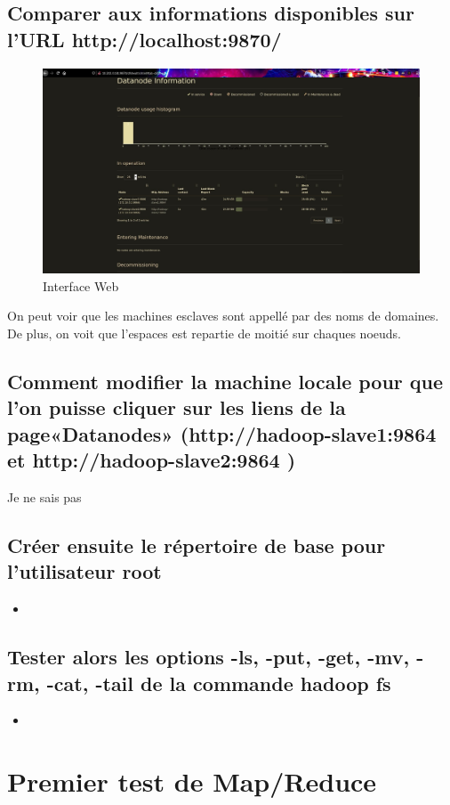 \documentclass[10pt,a4paper]{article}
\newcommand{\insertcode}[2]{\begin{itemize}\item[]\end{itemize}}
\begin{document}
\subsection{Comparer aux informations disponibles sur l’URL http://localhost:9870/}
\begin{figure}[h!]
\centering
\includegraphics[scale=0.20]{image/1.jpg}
\caption{Interface Web }
\label{fig:net }
\end{figure}
On peut voir que les machines esclaves sont appellé par des noms de domaines. De plus, on voit que l'espaces est repartie de moitié sur chaques noeuds.

\subsection{Comment   modifier   la   machine   locale   pour   que   l’on   puisse   cliquer   sur   les   liens   de   la   page«Datanodes» (http://hadoop-slave1:9864 et http://hadoop-slave2:9864 ) }

Je ne sais pas

\subsection{Créer ensuite le répertoire de base pour l’utilisateur root}
\insertcode{commande/7.txt}{Creation du FS }

\subsection{Tester alors les options -ls, -put, -get, -mv, -rm, -cat, -tail de la commande hadoop fs}
\insertcode{commande/8.txt}{Manipulation du FS }
\section{Premier test de Map/Reduce}
\end{document}
